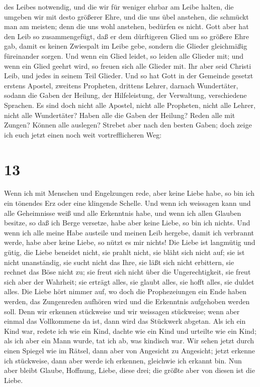 des Leibes notwendig,  und die wir für weniger ehrbar am
Leibe halten, die umgeben wir mit desto größerer Ehre, und die uns übel
anstehen, die schmückt man am meisten;  denn die uns wohl
anstehen, bedürfen es nicht. Gott aber hat den Leib so zusammengefügt,
daß er dem dürftigeren Glied um so größere Ehre gab, 
damit es keinen Zwiespalt im Leibe gebe, sondern die Glieder gleichmäßig
füreinander sorgen.  Und wenn ein Glied leidet, so leiden
alle Glieder mit; und wenn ein Glied geehrt wird, so freuen sich alle
Glieder mit.  Ihr aber seid Christi Leib, und jedes in
seinem Teil Glieder.  Und so hat Gott in der Gemeinde
gesetzt erstens Apostel, zweitens Propheten, drittens Lehrer, darnach
Wundertäter, sodann die Gaben der Heilung, der Hilfeleistung, der
Verwaltung, verschiedene Sprachen.  Es sind doch nicht
alle Apostel, nicht alle Propheten, nicht alle Lehrer, nicht alle
Wundertäter?  Haben alle die Gaben der Heilung? Reden
alle mit Zungen? Können alle auslegen?  Strebet aber nach
den besten Gaben; doch zeige ich euch jetzt einen noch weit
vortrefflicheren Weg:

\hypertarget{section-12}{%
\section{13}\label{section-12}}

 Wenn ich mit Menschen und Engelzungen rede, aber keine
Liebe habe, so bin ich ein tönendes Erz oder eine klingende Schelle.
 Und wenn ich weissagen kann und alle Geheimnisse weiß und
alle Erkenntnis habe, und wenn ich allen Glauben besitze, so daß ich
Berge versetze, habe aber keine Liebe, so bin ich nichts. 
Und wenn ich alle meine Habe austeile und meinen Leib hergebe, damit ich
verbrannt werde, habe aber keine Liebe, so nützt es mir nichts!
 Die Liebe ist langmütig und gütig, die Liebe beneidet
nicht, sie prahlt nicht, sie bläht sich nicht auf;  sie
ist nicht unanständig, sie sucht nicht das Ihre, sie läßt sich nicht
erbittern, sie rechnet das Böse nicht zu;  sie freut sich
nicht über die Ungerechtigkeit, sie freut sich aber der Wahrheit;
 sie erträgt alles, sie glaubt alles, sie hofft alles, sie
duldet alles.  Die Liebe hört nimmer auf, wo doch die
Prophezeiungen ein Ende haben werden, das Zungenreden aufhören wird und
die Erkenntnis aufgehoben werden soll.  Denn wir erkennen
stückweise und wir weissagen stückweise;  wenn aber
einmal das Vollkommene da ist, dann wird das Stückwerk abgetan.
 Als ich ein Kind war, redete ich wie ein Kind, dachte
wie ein Kind und urteilte wie ein Kind; als ich aber ein Mann wurde, tat
ich ab, was kindisch war.  Wir sehen jetzt durch einen
Spiegel wie im Rätsel, dann aber von Angesicht zu Angesicht; jetzt
erkenne ich stückweise, dann aber werde ich erkennen, gleichwie ich
erkannt bin.  Nun aber bleibt Glaube, Hoffnung, Liebe,
diese drei; die größte aber von diesen ist die Liebe.

